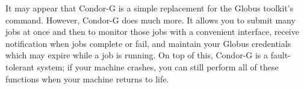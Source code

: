 It may appear that Condor-G is a simple replacement
for the Globus toolkit's  command.
However, Condor-G does much more.
It allows you to submit many jobs at once
and then to monitor those jobs with a convenient interface,
receive notification when jobs complete or fail,
and maintain your Globus credentials
which may expire while a job is running.
On top of this, Condor-G is a fault-tolerant system;
if your machine crashes,
you can still perform all of these functions when your machine returns to life.



%



